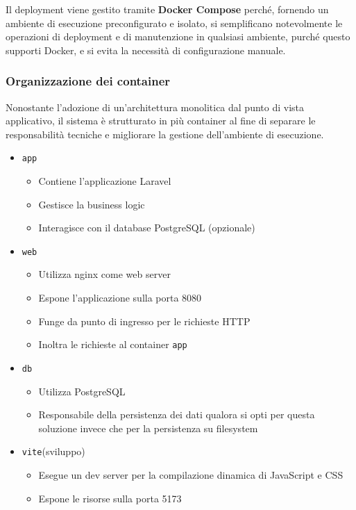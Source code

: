 \documentclass[a4paper,10pt]{article}
\begin{document}
\vspace{1em}

Il deployment viene gestito tramite \textbf{Docker Compose} perché, fornendo un ambiente di esecuzione preconfigurato e isolato, si semplificano notevolmente le operazioni di deployment e di manutenzione in qualsiasi ambiente, purché questo supporti Docker, e si evita la necessità di configurazione manuale.

\subsubsection{Organizzazione dei container}
Nonostante l'adozione di un'architettura monolitica dal punto di vista applicativo, il sistema è strutturato in più container al fine di separare le responsabilità tecniche e migliorare la gestione dell'ambiente di esecuzione.
\begin{itemize}
    \item \texttt{app}
        \begin{itemize}
            \item Contiene l'applicazione Laravel
            \item Gestisce la business logic
            \item Interagisce con il database PostgreSQL (opzionale)
        \end{itemize}
    \item \texttt{web}
        \begin{itemize}
            \item Utilizza nginx come web server
            \item Espone l'applicazione sulla porta 8080
            \item Funge da punto di ingresso per le richieste HTTP
            \item Inoltra le richieste al container \texttt{app}
        \end{itemize} 
    \item \texttt{db}
        \begin{itemize}
            \item Utilizza PostgreSQL
            \item Responsabile della persistenza dei dati qualora si opti per questa soluzione invece che per la persistenza su filesystem
        \end{itemize}
    \item \texttt{vite}(sviluppo)
        \begin{itemize}
            \item Esegue un dev server per la compilazione dinamica di JavaScript e CSS
            \item Espone le risorse sulla porta 5173
        \end{itemize}
    \end{itemize}
\end{document}
